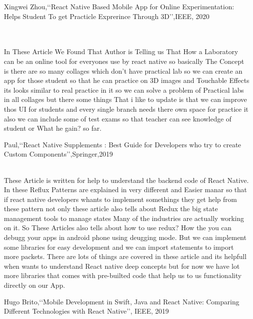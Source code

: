 \documentclass[12pt,a4paper]{report}
\begin{document}
\begin{enumerate}
	 {\bf\item  Xingwei Zhou,\lq\lq React Native Based Mobile App for Online Experimentation: Helps Student To  get Practicle Exprerince Through 3D\rq\rq,IEEE, 2020}\\
\\
In These Article We Found That Author is Telling us That How a Laboratory can be an online tool for everyones use by react native so basically The Concept is there are so many collages which don't have 
practical lab so we can create an app for those student so that he can practice on 3D images and Touchable Effects its looks similar to real practice in it so we can solve a problem of Practical labs in all collages but there some things That i like to update is that we can improve thos UI for students and every single branch needs there own space for practice it also we can include some of test exams so that teacher can see knowledge of student or What he gain? so far. 

\newpage


{\bf\item Paul,\lq\lq React Native Supplements : Best Guide for Developers who try to create Custom Components\rq\rq,Springer,2019}\\



 These Article is written for help to understand the backend code of React Native. In these Reflux Patterns are explained in very different and Easier manar so that if react native developers whants to implement somethings they get help from these pattern not only these article also tells about Redux the big state management tools to manage states Many of the industries are actually working on it.
So These Articles also tells about how to use redux? How the you can debugg your apps in android phone using deugging mode. But we can implement some libraries for easy development and we can import statements to import more packets. There are lots of things are covered in these article and its helpfull when wants to understand React native deep concepts but for now we have lot more libraries that comes with pre-builted code that help us to us functionality directly on our App. 


{\bf\item Hugo Brito,\lq\lq Mobile Development in Swift, Java and React Native: Comparing Different Technologies with React Native\rq\rq , IEEE, 2019}\\


\end{enumerate}
\end{document}
